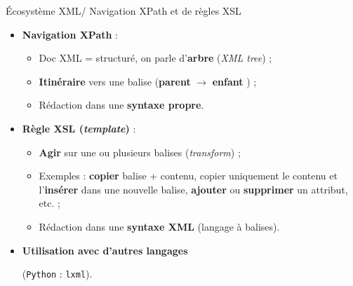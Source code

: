\documentclass{beamer}
\begin{document}
      \begin{frame}{Écosystème XML/ Navigation XPath et de règles XSL}
      \Large
      \begin{itemize}
          \item \textbf{Navigation XPath} :
          \begin{itemize}
              \item Doc XML = structuré, on parle d'\og \textbf{arbre} \fg{} (\textit{XML tree}) ; 
              \item \textbf{Itinéraire} vers une balise (\og \textbf{parent} \fg{} $\rightarrow$ \og \textbf{enfant} \fg{}) ;
              \item Rédaction dans une \textbf{syntaxe propre}. %
          \end{itemize}
          \bigskip
          \item \textbf{Règle XSL (\textit{template})} :
          \begin{itemize}
              \item \textbf{Agir} sur une ou plusieurs balises (\textit{transform}) ;
              \item Exemples : \textbf{copier} balise + contenu, copier uniquement le contenu et l'\textbf{insérer} dans une nouvelle balise, \textbf{ajouter} ou \textbf{supprimer} un attribut, etc. ;
              \item Rédaction dans une \textbf{syntaxe XML} (langage à balises).
          \end{itemize}
          \bigskip
          \item \textbf{Utilisation avec d'autres langages}
          
          \normalsize (\texttt{Python} :  \texttt{lxml}).
      \end{itemize}
       
      \end{frame}
      
\end{document}
